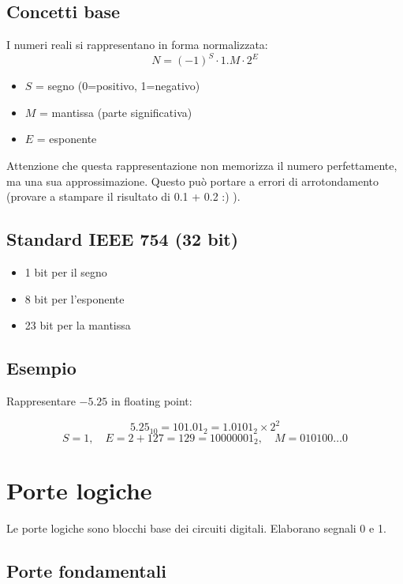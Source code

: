 \documentclass[12pt,a4paper]{article}
\begin{document}
\subsection{Concetti base}

I numeri reali si rappresentano in forma normalizzata:
\[
N = (-1)^S \cdot 1.M \cdot 2^E
\]

\begin{itemize}
    \item $S$ = segno (0=positivo, 1=negativo)
    \item $M$ = mantissa (parte significativa)
    \item $E$ = esponente
\end{itemize}

Attenzione che questa rappresentazione non memorizza il numero perfettamente, ma una sua approssimazione.
Questo può portare a errori di arrotondamento (provare a stampare il risultato di 0.1 + 0.2 :) ).

\subsection{\texorpdfstring{\colorbox{gray!50}{Standard IEEE 754 (32 bit)}}{}}

\begin{itemize}
    \item 1 bit per il segno
    \item 8 bit per l’esponente
    \item 23 bit per la mantissa
\end{itemize}

\subsection{\texorpdfstring{\colorbox{gray!50}{Esempio}}{}}

Rappresentare $-5.25$ in floating point:

\[
5.25_{10} = 101.01_2 = 1.0101_2 \times 2^2
\]
\[
S=1, \quad E=2+127=129=10000001_2, \quad M=010100\ldots0
\]

\newpage
\section{Porte logiche}

Le porte logiche sono blocchi base dei circuiti digitali. Elaborano segnali 0 e 1.

\subsection{Porte fondamentali}
\end{document}
